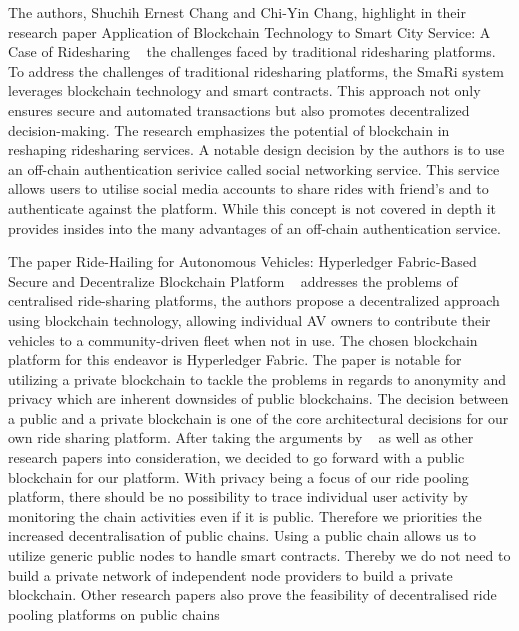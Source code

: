 The authors, Shuchih Ernest Chang and Chi-Yin Chang, highlight in their research paper Application of Blockchain Technology to Smart City Service: A Case of Ridesharing ~\cite{Chang.} the challenges faced by traditional ridesharing platforms. To address the challenges of traditional ridesharing platforms, the SmaRi system leverages blockchain technology and smart contracts. This approach not only ensures secure and automated transactions but also promotes decentralized decision-making. The research emphasizes the potential of blockchain in reshaping ridesharing services. A notable design decision by the authors is to use an off-chain authentication serivice called social networking service. This service allows users to utilise social media accounts to share rides with friend's and to authenticate against the platform. While this concept is not covered in depth it provides insides into the many advantages of an off-chain authentication service.

The paper Ride-Hailing for Autonomous Vehicles: Hyperledger Fabric-Based Secure and Decentralize Blockchain Platform ~\cite{Shivers.}  addresses the problems of centralised ride-sharing platforms, the authors propose a decentralized approach using blockchain technology, allowing individual AV owners to contribute their vehicles to a community-driven fleet when not in use. The chosen blockchain platform for this endeavor is Hyperledger Fabric. The paper is notable for utilizing a private blockchain to tackle the problems in regards to anonymity and privacy which are inherent downsides of public blockchains. The decision between a public and a private blockchain is one of the core architectural decisions for our own ride sharing platform.  After taking the arguments by ~\cite{Shivers.} as well as other research papers into consideration, we decided to go forward with a public blockchain for our platform. With privacy being a focus of our ride pooling platform, there should be no possibility to trace individual user activity by monitoring the chain activities even if it is public. Therefore we priorities the increased decentralisation of public chains. Using a public chain allows us to utilize generic public nodes to handle smart contracts. Thereby we do not need to build a private network of independent node providers to build a private blockchain. Other research papers also prove the feasibility of decentralised ride pooling platforms on public chains ~\cite{Mahmoud.2022} ~\cite{Joseph.} ~\cite{Baza.52520205282020}

